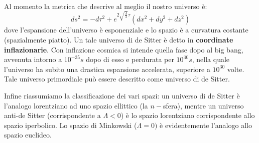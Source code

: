 Al momento la metrica che descrive al meglio il nostro universo è:
\begin{equation}
    ds^2 = - d\tau^2 + e^{ 2\sqrt{\frac{\Lambda}{3}} \tau}( dx^2 + dy^2 + dz^2)
    \label{eq.metrica_universo}
\end{equation}
dove l'espansione dell'universo è esponenziale e lo spazio è a curvatura costante (spazialmente piatto). Un tale universo di de Sitter è detto in \textbf{coordinate inflazionarie}. Con inflazione cosmica si intende quella fase dopo al big bang, avvenuta intorno a $10^{-35} s$ dopo di esso e perdurata per $10^{30} s$, nella quale l'universo ha subito una drastica espansione accelerata, superiore a $10^{30}$ volte. Tale universo primordiale può essere descritto come universo di de Sitter.

Infine riassumiamo la classificazione dei vari spazi: un universo di de Sitter è l'analogo lorentziano ad uno spazio ellittico (la $n-$sfera), mentre un universo anti-de Sitter (corrispondente a $\Lambda <0$) è lo spazio lorentziano corrispondente allo spazio iperbolico. Lo spazio di Minkowski ($\Lambda = 0)$ è evidentemente l'analogo allo spazio euclideo.

